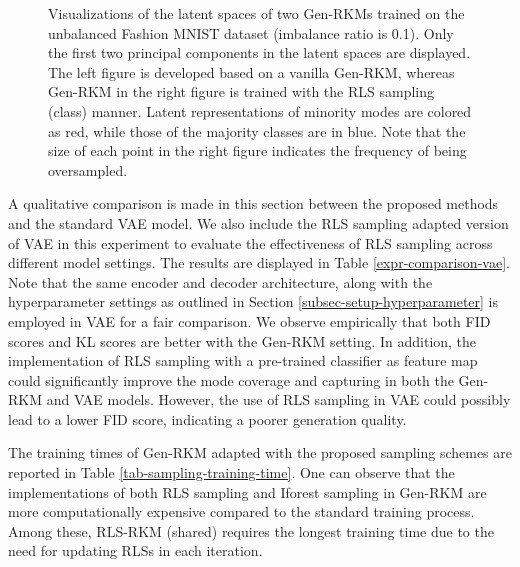 \begin{description}[leftmargin=0pt]
\begin{figure}[ht]
\begin{subfigure}{0.45\textwidth}
    \end{subfigure}
    \caption{Visualizations of the latent spaces of two Gen-RKMs trained on the unbalanced Fashion MNIST dataset (imbalance ratio is 0.1). Only the first two principal components in the latent spaces are displayed. The left figure is developed based on a vanilla Gen-RKM, whereas Gen-RKM in the right figure is trained with the RLS sampling (class) manner. Latent representations of minority modes are colored as red, while those of the majority classes are in blue. Note that the size of each point in the right figure indicates the frequency of being oversampled.}
    \label{fig-rls-latent-space-vis}
\end{figure}

    \item[Comparison to VAE and RLS-VAE ] A qualitative comparison is made in this section between the proposed methods and the standard VAE model. We also include the RLS sampling adapted version of VAE in this experiment to evaluate the effectiveness of RLS sampling across different model settings. The results are displayed in Table \ref{expr-comparison-vae}. Note that the same encoder and decoder architecture, along with the hyperparameter settings as outlined in Section \ref{subsec-setup-hyperparameter} is employed in VAE for a fair comparison. We observe empirically that both FID scores and KL scores are better with the Gen-RKM setting. In addition, the implementation of RLS sampling with a pre-trained classifier as feature map could significantly improve the mode coverage and capturing in both the Gen-RKM and VAE models. However, the use of RLS sampling in VAE could possibly lead to a lower FID score, indicating a poorer generation quality. 
    

    \item[Timings of different sampling schemes ] The training times of Gen-RKM adapted with the proposed sampling schemes are reported in Table \ref{tab-sampling-training-time}. One can observe that the implementations of both RLS sampling and Iforest sampling in Gen-RKM are more computationally expensive compared to the standard training process. Among these,  RLS-RKM (shared) requires the longest training time due to the need for updating RLSs in each iteration. 
    


\end{description}
